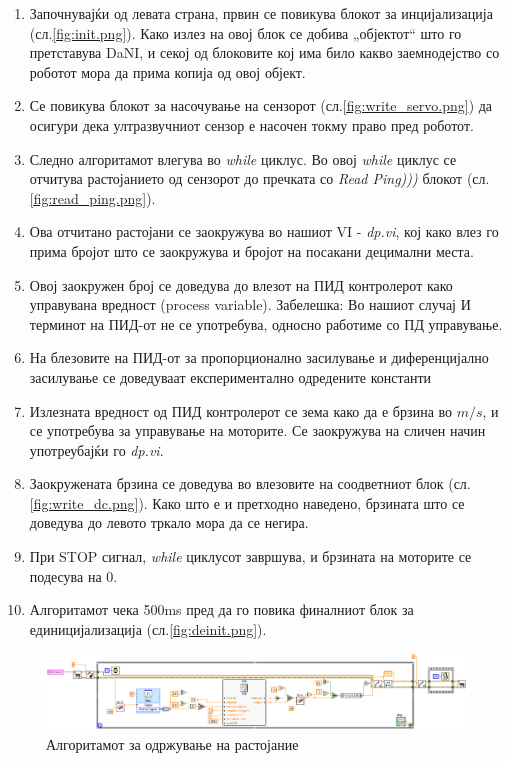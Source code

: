 \documentclass{article}
\begin{document}
\begin{enumerate}
\item Започнувајќи од левата страна, првин се повикува блокот за инцијализација (сл.\ref{fig:init.png}). Како излез на овој блок се добива „објектот“ што го претставува DaNI, и секој од блоковите кој има било какво заемнодејство со роботот мора да прима копија од овој објект.
\item Се повикува блокот за насочување на сензорот (сл.\ref{fig:write_servo.png}) да осигури дека ултразвучниот сензор е насочен токму право пред роботот.
\item Следно алгоритамот влегува во \textit{while} циклус. Во овој \textit{while} циклус се отчитува растојанието од сензорот до пречката со \textit{Read Ping)))} блокот (сл.\ref{fig:read_ping.png}).
\item Ова отчитано растојани се заокружува во нашиот VI - \textit{dp.vi}, кој како влез го прима бројот што се заокружува и бројот на посакани децимални места.
\item Овој заокружен број се доведува до влезот на ПИД контролерот како управувана вредност (process variable). Забелешка: Во нашиот случај И терминот на ПИД-от не се употребува, односно работиме со ПД управување.
\item На блезовите на ПИД-от за пропорционално засилување и диференцијално засилување се доведуваат експериментално одредените константи
\item Излезната вредност од ПИД контролерот се зема како да е брзина во $m/s$, и се употребува за управување на моторите. Се заокружува на сличен начин употреубајќи го \textit{dp.vi}.
\item Заокружената брзина се доведува во влезовите на соодветниот блок (сл.\ref{fig:write_dc.png}). Како што е и претходно наведено, брзината што се доведува до левото тркало мора да се негира.
\item При STOP сигнал, \textit{while} циклусот завршува, и брзината на моторите се подесува на 0.
\item Алгоритамот чека 500ms пред да го повика финалниот блок за единицијализација (сл.\ref{fig:deinit.png}).  
\end{enumerate}


\begin{figure}[H]
\centering
\includegraphics[width = 0.80\paperheight,angle=90]{PID_Control.png}
\caption{Алгоритамот за одржување на растојание}
\label{fig:PID_Control.png}
\end{figure}
\end{document}

